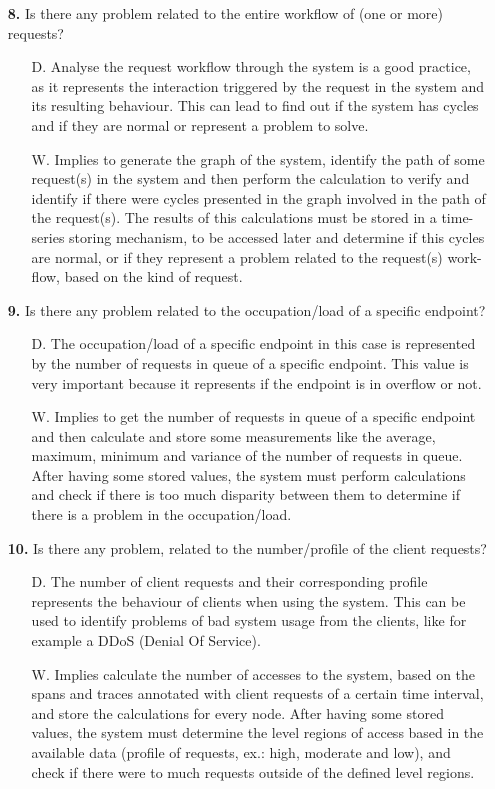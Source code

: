 \begin{itemize}
    \item[\textbf{8.}] Is there any problem related to the entire workflow of (one or more) requests?
    \begin{itemize}
        \item[D.] Analyse the request workflow through the system is a good practice, as it represents the interaction triggered by the request in the system and its resulting behaviour. This can lead to find out if the system has cycles and if they are normal or represent a problem to solve.  
        \item[W.] Implies to generate the graph of the system, identify the path of some request(s) in the system and then perform the calculation to verify and identify if there were cycles presented in the graph involved in the path of the request(s). The results of this calculations must be stored in a time-series storing mechanism, to be accessed later and determine if this cycles are normal, or if they represent a problem related to the request(s) work-flow, based on the kind of request.
    \end{itemize}

    \item[\textbf{9.}] Is there any problem related to the occupation/load of a specific endpoint?
    \begin{itemize}
        \item[D.] The occupation/load of a specific endpoint in this case is represented by the number of requests in queue of a specific endpoint. This value is very important because it represents if the endpoint is in overflow or not.
        \item[W.] Implies to get the number of requests in queue of a specific endpoint and then calculate and store some measurements like the average, maximum, minimum and variance of the number of requests in queue. After having some stored values, the system must perform calculations and check if there is too much disparity between them to determine if there is a problem in the occupation/load.
    \end{itemize}

    \item[\textbf{10.}] Is there any problem, related to the number/profile of the client requests?
    \begin{itemize}
        \item[D.] The number of client requests and their corresponding profile represents the behaviour of clients when using the system. This can be used to identify problems of bad system usage from the clients, like for example a DDoS (Denial Of Service).
        \item[W.] Implies calculate the number of accesses to the system, based on the spans and traces annotated with client requests of a certain time interval, and store the calculations for every node. After having some stored values, the system must determine the level regions of access based in the available data (profile of requests, ex.: high, moderate and low), and check if there were to much requests outside of the defined level regions.
    \end{itemize}
\end{itemize}

